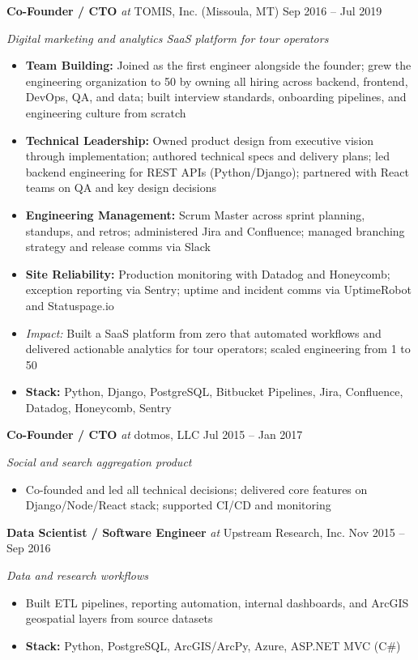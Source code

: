 \documentclass[10pt]{article}
\newcommand{\roleline}[4]{%
  \noindent\textbf{#1} \textit{at} #2 #3 \hfill #4\par
}
\begin{document}
\roleline{Co-Founder / CTO}{TOMIS, Inc.}{(Missoula, MT)}{Sep 2016 -- Jul 2019}
\emph{Digital marketing and analytics SaaS platform for tour operators}\par
\begin{itemize}
  \item \textbf{Team Building:} Joined as the first engineer alongside the founder; grew the engineering organization to 50 by owning all hiring across backend, frontend, DevOps, QA, and data; built interview standards, onboarding pipelines, and engineering culture from scratch
  \item \textbf{Technical Leadership:} Owned product design from executive vision through implementation; authored technical specs and delivery plans; led backend engineering for REST APIs (Python/Django); partnered with React teams on QA and key design decisions
  \item \textbf{Engineering Management:} Scrum Master across sprint planning, standups, and retros; administered Jira and Confluence; managed branching strategy and release comms via Slack
  \item \textbf{Site Reliability:} Production monitoring with Datadog and Honeycomb; exception reporting via Sentry; uptime and incident comms via UptimeRobot and Statuspage.io
  \item \textit{Impact:} Built a SaaS platform from zero that automated workflows and delivered actionable analytics for tour operators; scaled engineering from 1 to 50
  \item \textbf{Stack:} Python, Django, PostgreSQL, Bitbucket Pipelines, Jira, Confluence, Datadog, Honeycomb, Sentry
\end{itemize}


\roleline{Co-Founder / CTO}{dotmos, LLC}{}{Jul 2015 -- Jan 2017}
\emph{Social and search aggregation product}\par
\begin{itemize}
  \item Co-founded and led all technical decisions; delivered core features on Django/Node/React stack; supported CI/CD and monitoring
\end{itemize}


\roleline{Data Scientist / Software Engineer}{Upstream Research, Inc.}{}{Nov 2015 -- Sep 2016}
\emph{Data and research workflows}\par
\begin{itemize}
  \item Built ETL pipelines, reporting automation, internal dashboards, and ArcGIS geospatial layers from source datasets
  \item \textbf{Stack:} Python, PostgreSQL, ArcGIS/ArcPy, Azure, ASP.NET MVC (C\#)
\end{itemize}
\end{document}
